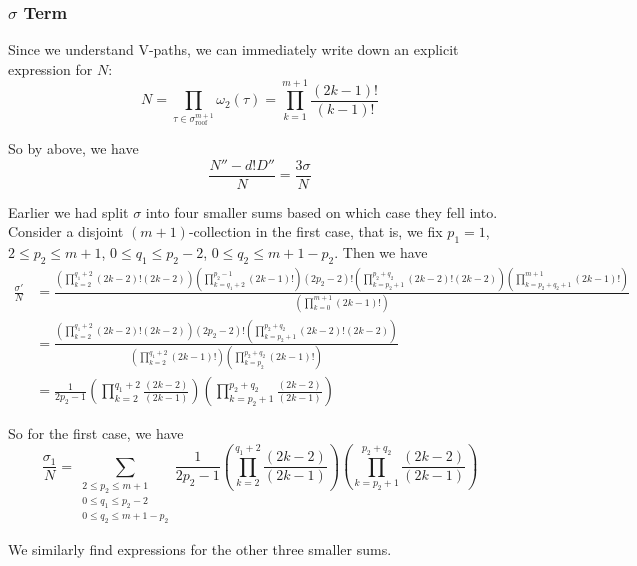 \documentclass[11pt]{article}
\theoremstyle{definition}
\theoremstyle{definition}
\theoremstyle{plain}
\theoremstyle{plain}
\theoremstyle{plain}
\theoremstyle{definition}
\begin{document}
\subsubsection*{$\sigma$ Term}

Since we understand V-paths, we can immediately write down an explicit expression for $N$:
\begin{equation*}
N = \prod\limits_{\tau\in\sigma_{\text{roof}}^{m+1}}\omega_2(\tau) = \prod\limits_{k=1}^{m+1}\frac{(2k-1)!}{(k-1)!}
\end{equation*}

So by above, we have
\begin{equation*}
\frac{N''-d!D''}{N} = \frac{3\sigma}{N}
\end{equation*}

Earlier we had split $\sigma$ into four smaller sums based on which case they fell into. Consider a disjoint $(m+1)$-collection in the first case, that is, we fix $p_1 = 1$, $2\leq p_2\leq m+1$, $0\leq q_1\leq p_2 - 2$, $0\leq q_2 \leq m+1-p_2$. Then we have
\begin{align*}
\frac{\sigma'}{N} &= \frac{\left(\prod\limits_{k=2}^{q_1+2}(2k-2)!(2k-2)\right)\left(\prod\limits_{k=q_1+2}^{p_2-1}(2k-1)!\right)(2p_2-2)!\left(\prod\limits_{k=p_2+1}^{p_2+q_2}(2k-2)!(2k-2)\right)\left(\prod\limits_{k=p_2+q_2+1}^{m+1}(2k-1)!\right)}{\left(\prod\limits_{k=0}^{m+1}(2k-1)!\right)} \\
&= \frac{\left(\prod\limits_{k=2}^{q_1+2}(2k-2)!(2k-2)\right)(2p_2-2)!\left(\prod\limits_{k=p_2+1}^{p_2+q_2}(2k-2)!(2k-2)\right)}{\left(\prod\limits_{k=2}^{q_1+2}(2k-1)!\right)\left(\prod\limits_{k=p_2}^{p_2+q_2}(2k-1)!\right)} \\
&= \frac{1}{2p_2-1}\left(\prod\limits_{k=2}^{q_1+2}\frac{(2k-2)}{(2k-1)}\right)\left(\prod\limits_{k=p_2+1}^{p_2+q_2}\frac{(2k-2)}{(2k-1)}\right)
\end{align*}

So for the first case, we have
\begin{equation*}
\frac{\sigma_1}{N} = \sum\limits_{\substack{2\leq p_2\leq m+1 \\ 0\leq q_1 \leq p_2-2 \\ 0\leq q_2 \leq m+1-p_2}}\frac{1}{2p_2-1}\left(\prod\limits_{k=2}^{q_1+2}\frac{(2k-2)}{(2k-1)}\right)\left(\prod\limits_{k=p_2+1}^{p_2+q_2}\frac{(2k-2)}{(2k-1)}\right)
\end{equation*}

We similarly find expressions for the other three smaller sums.
\end{document}
